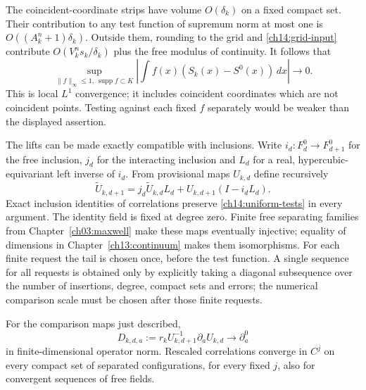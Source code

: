 

The coincident-coordinate strips have volume $O(\delta_k)$ on a fixed
compact set. Their contribution to any test function of supremum norm at most one
is $O((A_k^n+1)\delta_k)$. Outside them, rounding to the grid and
\eqref{ch14:grid-input} contribute
$O(V_k^ns_k/\delta_k)$ plus the free modulus of continuity.
It follows that
\begin{equation}\label{ch14:uniform-tests}
 \sup_{\|f\|_\infty\le1,\ \operatorname{supp}f\subset K}
 \left|\int f(x)(S_k(x)-S^0(x))\,dx\right|\longrightarrow0.
\end{equation}
This is local $L^1$ convergence; it includes coincident coordinates which
are not coincident points. Testing against each fixed $f$ separately would
be weaker than the displayed assertion.

The lifts can be made exactly compatible with inclusions. Write
$i_d:F_d^0\to F_{d+1}^0$ for the free inclusion,
$j_d$ for the interacting inclusion and $L_d$ for a real,
hypercubic-equivariant left inverse of $i_d$. From provisional maps
$U_{k,d}$ define recursively
\[
 \widetilde U_{k,d+1}
 =j_d\widetilde U_{k,d}L_d+U_{k,d+1}(I-i_dL_d).
\]
Exact inclusion identities of correlations preserve
\eqref{ch14:uniform-tests} in every argument. The identity field is fixed at degree
zero. Finite free separating families from Chapter~\ref{ch03:maxwell}
make these maps eventually injective; equality of dimensions in
Chapter~\ref{ch13:continuum} makes them isomorphisms. For each finite
request the tail is chosen once, before the test function. A single
sequence for all requests is obtained only by explicitly taking a diagonal subsequence over
the number of insertions, degree, compact sets and errors; the numerical comparison
scale must be chosen after those finite requests.

\begin{proposition}
\label{ch14:smooth-comparison}
For the comparison maps just described,
\[
 D_{k,d,a}:=r_kU_{k,d+1}^{-1}\partial_aU_{k,d}
                   \longrightarrow\partial_a^0
\]
in finite-dimensional operator norm. Rescaled correlations converge
in $C^j$ on every compact set of separated configurations, for every fixed $j$,
also for convergent sequences of free fields.
\end{proposition}

